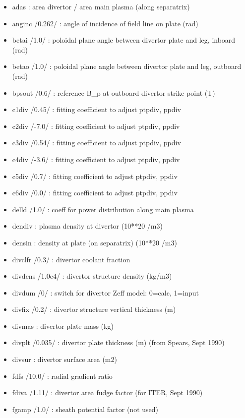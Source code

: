 \documentclass[]{article}
\begin{document}
\begin{itemize}
\itemsep1pt\parskip0pt
\item
  adas : area divertor / area main plasma (along separatrix)
\item
  anginc /0.262/ : angle of incidence of field line on plate (rad)
\item
  betai /1.0/ : poloidal plane angle between divertor plate and leg,
  inboard (rad)
\item
  betao /1.0/ : poloidal plane angle between divertor plate and leg,
  outboard (rad)
\item
  bpsout /0.6/ : reference B\_p at outboard divertor strike point (T)
\item
  c1div /0.45/ : fitting coefficient to adjust ptpdiv, ppdiv
\item
  c2div /-7.0/ : fitting coefficient to adjust ptpdiv, ppdiv
\item
  c3div /0.54/ : fitting coefficient to adjust ptpdiv, ppdiv
\item
  c4div /-3.6/ : fitting coefficient to adjust ptpdiv, ppdiv
\item
  c5div /0.7/ : fitting coefficient to adjust ptpdiv, ppdiv
\item
  c6div /0.0/ : fitting coefficient to adjust ptpdiv, ppdiv
\item
  delld /1.0/ : coeff for power distribution along main plasma
\item
  dendiv : plasma density at divertor (10**20 /m3)
\item
  densin : density at plate (on separatrix) (10**20 /m3)
\item
  divclfr /0.3/ : divertor coolant fraction
\item
  divdens /1.0e4/ : divertor structure density (kg/m3)
\item
  divdum /0/ : switch for divertor Zeff model: 0=calc, 1=input
\item
  divfix /0.2/ : divertor structure vertical thickness (m)
\item
  divmas : divertor plate mass (kg)
\item
  divplt /0.035/ : divertor plate thickness (m) (from Spears, Sept 1990)
\item
  divsur : divertor surface area (m2)
\item
  fdfs /10.0/ : radial gradient ratio
\item
  fdiva /1.11/ : divertor area fudge factor (for ITER, Sept 1990)
\item
  fgamp /1.0/ : sheath potential factor (not used)

\end{itemize}
\end{document}
